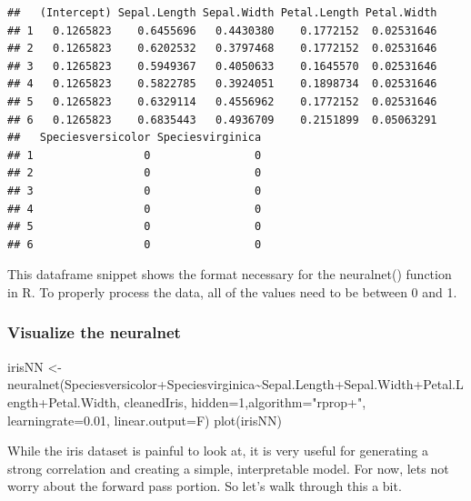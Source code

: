 \documentclass[
]{article}
\newenvironment{Shaded}{\begin{snugshade}}{\end{snugshade}}
\newcommand{\AttributeTok}[1]{\textcolor[rgb]{0.77,0.63,0.00}{#1}}
\newcommand{\DecValTok}[1]{\textcolor[rgb]{0.00,0.00,0.81}{#1}}
\newcommand{\FloatTok}[1]{\textcolor[rgb]{0.00,0.00,0.81}{#1}}
\newcommand{\FunctionTok}[1]{\textcolor[rgb]{0.00,0.00,0.00}{#1}}
\newcommand{\NormalTok}[1]{#1}
\newcommand{\OtherTok}[1]{\textcolor[rgb]{0.56,0.35,0.01}{#1}}
\newcommand{\SpecialCharTok}[1]{\textcolor[rgb]{0.00,0.00,0.00}{#1}}
\newcommand{\StringTok}[1]{\textcolor[rgb]{0.31,0.60,0.02}{#1}}
\begin{document}
\begin{verbatim}
##   (Intercept) Sepal.Length Sepal.Width Petal.Length Petal.Width
## 1   0.1265823    0.6455696   0.4430380    0.1772152  0.02531646
## 2   0.1265823    0.6202532   0.3797468    0.1772152  0.02531646
## 3   0.1265823    0.5949367   0.4050633    0.1645570  0.02531646
## 4   0.1265823    0.5822785   0.3924051    0.1898734  0.02531646
## 5   0.1265823    0.6329114   0.4556962    0.1772152  0.02531646
## 6   0.1265823    0.6835443   0.4936709    0.2151899  0.05063291
##   Speciesversicolor Speciesvirginica
## 1                 0                0
## 2                 0                0
## 3                 0                0
## 4                 0                0
## 5                 0                0
## 6                 0                0
\end{verbatim}

This dataframe snippet shows the format necessary for the neuralnet()
function in R. To properly process the data, all of the values need to
be between 0 and 1.

\hypertarget{visualize-the-neuralnet}{%
\subsubsection{Visualize the neuralnet}\label{visualize-the-neuralnet}}

\begin{Shaded}
\begin{Highlighting}[]
\NormalTok{irisNN }\OtherTok{\textless{}{-}} \FunctionTok{neuralnet}\NormalTok{(Speciesversicolor}\SpecialCharTok{+}\NormalTok{Speciesvirginica}\SpecialCharTok{\textasciitilde{}}\NormalTok{Sepal.Length}\SpecialCharTok{+}\NormalTok{Sepal.Width}\SpecialCharTok{+}\NormalTok{Petal.Length}\SpecialCharTok{+}\NormalTok{Petal.Width,}
\NormalTok{                    cleanedIris, }\AttributeTok{hidden=}\DecValTok{1}\NormalTok{,}\AttributeTok{algorithm=}\StringTok{"rprop+"}\NormalTok{,}
                    \AttributeTok{learningrate=}\FloatTok{0.01}\NormalTok{, }\AttributeTok{linear.output=}\NormalTok{F)}
\FunctionTok{plot}\NormalTok{(irisNN)}
\end{Highlighting}
\end{Shaded}

While the iris dataset is painful to look at, it is very useful for
generating a strong correlation and creating a simple, interpretable
model. For now, lets not worry about the forward pass portion. So let's
walk through this a bit.
\end{document}
